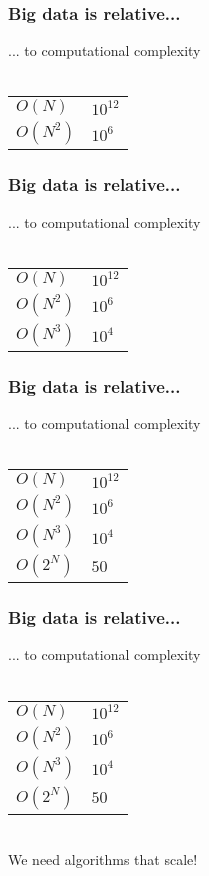 \documentclass{beamer}
\begin{document}
\begin{frame}
	\frametitle{Big data is relative...}
	\begin{center}
		... to computational complexity\\~\\
		\begin{tabular}{ l l }
			$O(N)$ & $10^{12}$ \\
			$O(N^2) $ & $ 10^{6}$\\
		\end{tabular}
	\end{center}
\end{frame}

\begin{frame}
	\frametitle{Big data is relative...}
	\begin{center}
		... to computational complexity\\~\\
		\begin{tabular}{ l l }
			$O(N)$ & $10^{12}$ \\
			$O(N^2) $ & $ 10^{6}$\\
			$O(N^3) $ & $ 10^{4}$\\			
		\end{tabular}
	\end{center}
\end{frame}

\begin{frame}
	\frametitle{Big data is relative...}
	\begin{center}
		... to computational complexity\\~\\
		\begin{tabular}{ l l }
			$O(N)$ & $10^{12}$ \\
			$O(N^2) $ & $ 10^{6}$\\
			$O(N^3) $ & $ 10^{4}$\\
			$O(2^N) $ & $ 50$\\				
		\end{tabular}
	\end{center}
\end{frame}

\begin{frame}
	\frametitle{Big data is relative...}
	\begin{center}
		... to computational complexity\\~\\
		\begin{tabular}{ l l }
			$O(N)$ & $10^{12}$ \\
			$O(N^2) $ & $ 10^{6}$\\
			$O(N^3) $ & $ 10^{4}$\\
			$O(2^N) $ & $ 50$\\				
		\end{tabular}
		\medskip
		\\We need algorithms that scale!
	\end{center}
\end{frame}
\end{document}

